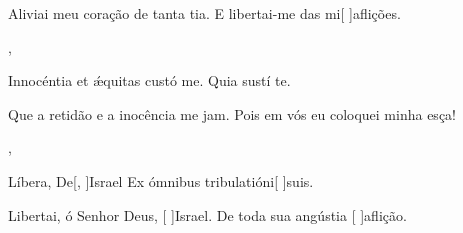 {{\item {}Aliviai meu coração de tanta tia. {\ResponsoriumC} E libertai-me das mi[ ]{a}flições.~\Responsorium},
{\item {}Innocéntia et ǽquitas custó me. {\ResponsoriumC} Quia sustí te.~\Responsorium}%
{\item {}Que a retidão e a inocência me jam. {\ResponsoriumC} Pois em vós eu coloquei minha esça!~\Responsorium},
{\item {}Líbera, De[, ]{Is}rael {\ResponsoriumC} Ex ómnibus tribulatióni[ ]{su}is.~\Responsorium}%
{\item {}Libertai, ó Senhor Deus, [ ]{Is}rael. {\ResponsoriumC} De toda sua angústia [ ]{a}flição.~\Responsorium}
}